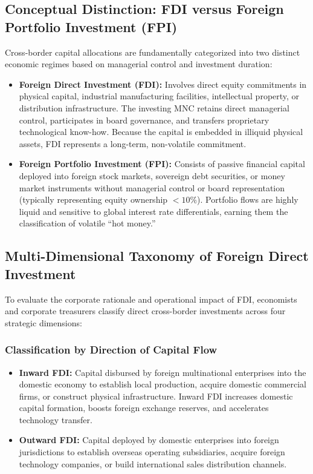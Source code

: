 \vspace{0.3em}

\subsection{Conceptual Distinction: FDI versus Foreign Portfolio Investment (FPI)}
Cross-border capital allocations are fundamentally categorized into two distinct economic regimes based on managerial control and investment duration:
\begin{itemize}[leftmargin=1.5em]
    \item \textbf{Foreign Direct Investment (FDI):} Involves direct equity commitments in physical capital, industrial manufacturing facilities, intellectual property, or distribution infrastructure. The investing MNC retains direct managerial control, participates in board governance, and transfers proprietary technological know-how. Because the capital is embedded in illiquid physical assets, FDI represents a long-term, non-volatile commitment.
    \item \textbf{Foreign Portfolio Investment (FPI):} Consists of passive financial capital deployed into foreign stock markets, sovereign debt securities, or money market instruments without managerial control or board representation (typically representing equity ownership $< 10\%$). Portfolio flows are highly liquid and sensitive to global interest rate differentials, earning them the classification of volatile ``hot money.''
\end{itemize}

\vspace{0.3em}

\subsection{Multi-Dimensional Taxonomy of Foreign Direct Investment}
To evaluate the corporate rationale and operational impact of FDI, economists and corporate treasurers classify direct cross-border investments across four strategic dimensions:

\subsubsection{Classification by Direction of Capital Flow}
\begin{itemize}[leftmargin=1.5em]
    \item \textbf{Inward FDI:} Capital disbursed by foreign multinational enterprises into the domestic economy to establish local production, acquire domestic commercial firms, or construct physical infrastructure. Inward FDI increases domestic capital formation, boosts foreign exchange reserves, and accelerates technology transfer.
    \item \textbf{Outward FDI:} Capital deployed by domestic enterprises into foreign jurisdictions to establish overseas operating subsidiaries, acquire foreign technology companies, or build international sales distribution channels.
\end{itemize}

